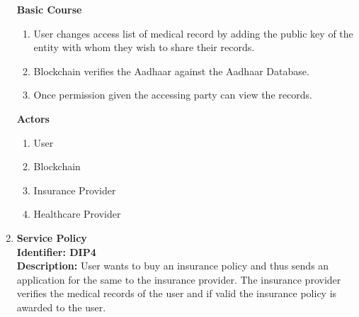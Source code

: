 \begin{enumerate}
	      \textbf{Basic Course}
	      \begin{enumerate}
	      	\item	User changes access list of medical record by adding the public key of the entity with whom they wish to share their records.
	      	\item	Blockchain verifies the Aadhaar against the Aadhaar Database.
	      	\item	Once permission given the accessing party can view the records.
	      \end{enumerate}
	      \textbf{Actors}
	      \begin{enumerate}
	      	\item User
	      	\item Blockchain
	      	\item Insurance Provider
	      	\item Healthcare Provider
	      \end{enumerate} 
	      	                  
	\item \textbf{Service Policy} \\
	      \textbf{Identifier: DIP4} \\
	      \textbf{Description:} User wants to buy an insurance policy and thus sends an application for the same to the insurance provider. The insurance provider verifies the medical records of the user and if valid the insurance policy is awarded to the user.
	      	                      

\end{enumerate}
